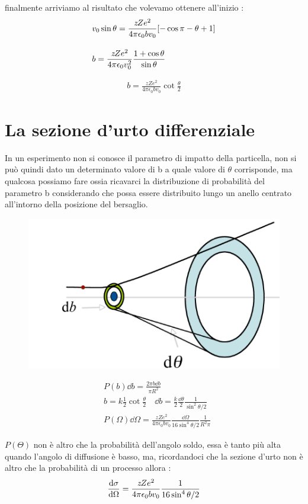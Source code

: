 finalmente arriviamo al risultato che volevamo ottenere all'inizio : 
\begin{align*}
        &v_{0}\sin{\theta} = \frac{\textit{z}Ze^2}{4\pi\epsilon_{0}bv_{0}}\qty[-\cos{\pi - \theta} + 1] \\[1em]
        &b = \frac{\textit{z}Ze^2}{4\pi\epsilon_{0}v_{0}^2}\frac{1 + \cos{\theta}}{\sin{\theta}} 
\end{align*}
\newpage
\begin{tcolorbox}[colback=red!5!white,colframe=red!50!black,title=ATTENZIONE !]
\begin{align*}
        b = \frac{\textit{z}Ze^2}{4\pi\epsilon_{0}bv_{0}}\cot{\frac{\theta}{2}}
\end{align*}
\end{tcolorbox}
\section{La sezione d'urto differenziale}
In un esperimento non si conosce il parametro di impatto della particella, non si può quindi
dato un determinato valore di b a quale valore di $\theta$ corrisponde, ma qualcosa possiamo fare ossia 
ricavarci la distribuzione di probabilità del parametro b considerando che possa essere distribuito 
lungo un anello centrato all'intorno della posizione del bersaglio.
\begin{figure}[!h]
    \centering
    \includegraphics[scale=0.8]{ch5Ratherford/distribuzioneB}
\end{figure}

\begin{align*}
    &P(b)\dd{b} = \frac{2\pi b\dd{b}}{\pi R^2} \\[1em]
    &b = k\frac{1}{2}\cot{\frac{\theta}{2}} \quad \dd{b} = \frac{k}{2}\frac{\dd{\theta}}{2}\frac{1}{\sin^2{\theta/2}} \\[1em]
    &P(\Omega)\dd{\Omega} = \frac{\textit{z}Ze^2}{4\pi\epsilon_{0}bv_{0}}\frac{\dd{\Omega}}{16\sin^4{\theta/2}}\frac{1}{R^2\pi}
\end{align*}

$P(\Theta)$ non è altro che la probabilità dell'angolo soldo, essa è tanto più alta quando l'angolo di diffusione è basso, 
ma, ricordandoci che la sezione d'urto non è altro che la probabilità di un processo allora : 
\begin{align*}
        \dv{\sigma}{\Omega} = \frac{\textit{z}Ze^2}{4\pi\epsilon_{0}bv_{0}}\frac{1}{16\sin^4{\theta/2}}
\end{align*}
